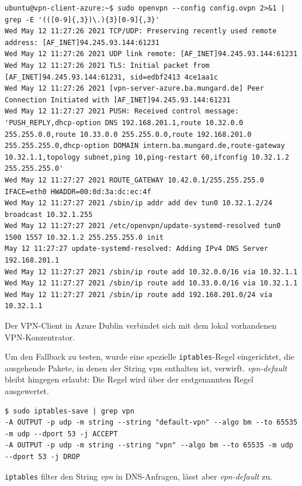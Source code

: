 \begin{listing}[h]
\begin{verbatim}
ubuntu@vpn-client-azure:~$ sudo openvpn --config config.ovpn 2>&1 | grep -E '(([0-9]{,3})\.){3}[0-9]{,3}'
Wed May 12 11:27:26 2021 TCP/UDP: Preserving recently used remote address: [AF_INET]94.245.93.144:61231
Wed May 12 11:27:26 2021 UDP link remote: [AF_INET]94.245.93.144:61231
Wed May 12 11:27:26 2021 TLS: Initial packet from [AF_INET]94.245.93.144:61231, sid=edbf2413 4ce1aa1c
Wed May 12 11:27:26 2021 [vpn-server-azure.ba.mungard.de] Peer Connection Initiated with [AF_INET]94.245.93.144:61231
Wed May 12 11:27:27 2021 PUSH: Received control message: 'PUSH_REPLY,dhcp-option DNS 192.168.201.1,route 10.32.0.0 255.255.0.0,route 10.33.0.0 255.255.0.0,route 192.168.201.0 255.255.255.0,dhcp-option DOMAIN intern.ba.mungard.de,route-gateway 10.32.1.1,topology subnet,ping 10,ping-restart 60,ifconfig 10.32.1.2 255.255.255.0'
Wed May 12 11:27:27 2021 ROUTE_GATEWAY 10.42.0.1/255.255.255.0 IFACE=eth0 HWADDR=00:0d:3a:dc:ec:4f
Wed May 12 11:27:27 2021 /sbin/ip addr add dev tun0 10.32.1.2/24 broadcast 10.32.1.255
Wed May 12 11:27:27 2021 /etc/openvpn/update-systemd-resolved tun0 1500 1557 10.32.1.2 255.255.255.0 init
May 12 11:27:27 update-systemd-resolved: Adding IPv4 DNS Server 192.168.201.1
Wed May 12 11:27:27 2021 /sbin/ip route add 10.32.0.0/16 via 10.32.1.1
Wed May 12 11:27:27 2021 /sbin/ip route add 10.33.0.0/16 via 10.32.1.1
Wed May 12 11:27:27 2021 /sbin/ip route add 192.168.201.0/24 via 10.32.1.1

\end{verbatim}
\caption{Der VPN-Client in Azure Dublin verbindet sich mit dem lokal vorhandenen VPN-Konzentrator.}
\label{openvpn-connect-log}
\end{listing}\FloatBarrier
\newpage
Um den Fallback zu testen, wurde eine spezielle \texttt{iptables}-Regel eingerichtet, die ausgehende Pakete, in denen der String \glqq vpn\grqq{} enthalten ist, verwirft. \textit{vpn-default} bleibt hingegen erlaubt: Die Regel wird über der erstgenannten Regel ausgewertet.
\begin{listing}[h]
\begin{verbatim}
$ sudo iptables-save | grep vpn
-A OUTPUT -p udp -m string --string "default-vpn" --algo bm --to 65535 -m udp --dport 53 -j ACCEPT
-A OUTPUT -p udp -m string --string "vpn" --algo bm --to 65535 -m udp --dport 53 -j DROP

\end{verbatim}
\caption{\texttt{iptables} filter den String \textit{vpn} in DNS-Anfragen, lässt aber \textit{vpn-default} zu.}
\label{iptables-deny-string-dns}
\end{listing}\FloatBarrier
